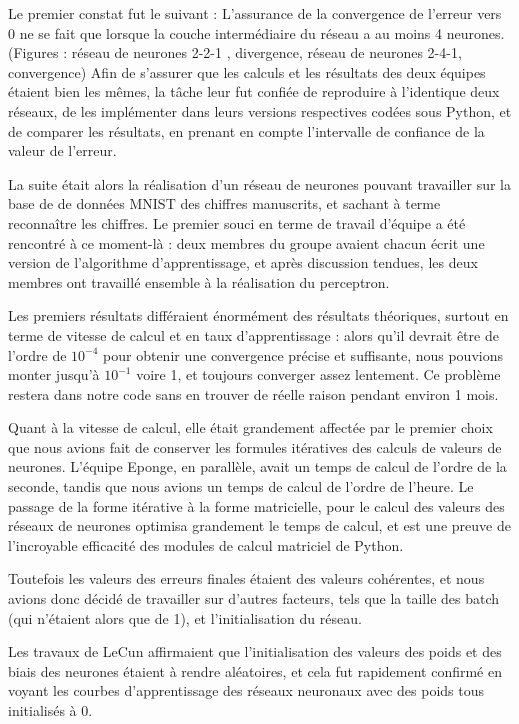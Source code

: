 \documentclass[
    10pt,
    a4paper,
    oneside,
    headinclude,footinclude,
    BCOR=5mm,
]{scrartcl}
\begin{document}
Le premier constat fut le suivant : L'assurance de la convergence de l'erreur vers 0 ne se fait que lorsque la couche intermédiaire du réseau a au moins 4
neurones. (Figures : réseau de neurones 2-2-1 , divergence, réseau de neurones 2-4-1, convergence) Afin de s'assurer que les calculs et les résultats des
deux équipes étaient bien les mêmes, la tâche leur fut confiée de reproduire à l'identique deux réseaux, de les implémenter dans leurs versions respectives
codées sous Python, et de comparer les résultats, en prenant en compte l'intervalle de confiance de la valeur de l'erreur.

La suite était alors la réalisation d'un réseau de neurones pouvant travailler sur la base de de données MNIST des chiffres manuscrits, et sachant à terme
reconnaître les chiffres. Le premier souci en terme de travail d'équipe a été rencontré à ce moment-là : deux membres du groupe avaient chacun écrit une
version de l'algorithme d'apprentissage, et après discussion tendues, les deux membres ont travaillé ensemble à la réalisation du perceptron.

Les premiers résultats différaient énormément des résultats théoriques, surtout en terme de vitesse de calcul et en taux d'apprentissage : alors qu'il
devrait être de l'ordre de $10^{-4}$ pour obtenir une convergence précise et suffisante, nous pouvions monter jusqu'à $10^{-1}$ voire 1, et toujours converger
assez lentement. Ce problème restera dans notre code sans en trouver de réelle raison pendant environ 1 mois.

Quant à la vitesse de calcul, elle était grandement affectée par le premier choix que nous avions fait de conserver les formules itératives des calculs de
valeurs de neurones. L'équipe Eponge, en parallèle, avait un temps de calcul de l'ordre de la seconde, tandis que nous avions un temps de calcul de l'ordre
de l'heure. Le passage de la forme itérative à la forme matricielle, pour le calcul des valeurs des réseaux de neurones optimisa grandement le temps de
calcul, et est une preuve de l'incroyable efficacité des modules de calcul matriciel de Python. 

Toutefois les valeurs des erreurs finales étaient des valeurs cohérentes, et nous avions donc décidé de travailler sur d'autres facteurs, tels que la
taille des batch (qui n'étaient alors que de 1), et l'initialisation du réseau.

Les travaux de LeCun affirmaient que l'initialisation des valeurs des poids et des biais des neurones étaient à rendre aléatoires, et cela fut rapidement
confirmé en voyant les courbes d'apprentissage des réseaux neuronaux avec des poids tous initialisés à 0.
\end{document}
